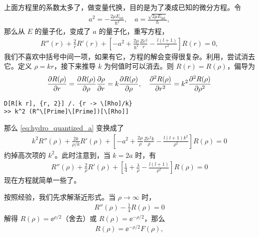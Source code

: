 上面方程里的系数太多了，做变量代换，目的是为了凑成已知的微分方程。令
\begin{align}
    a^2 = -\frac{2\mu E_{\mathrm{int}}}{\hbar^2}, \quad 
    a = \frac{\sqrt{2\mu E_{\mathrm{int}}}} {\hbar}, 
\end{align}
那么从 $E$ 的量子化，变成了 $a$ 的量子化，重写方程，
\begin{align}
    R''(r) + \frac2r R'(r) + \left[
        -a^2 + \frac{2\mu}{\hbar^2} \frac{Ze^2}{r} - \frac{l(l+1)}{r^2}
    \right] R(r) = 0, \label{eq:hydro_quantized_a}
\end{align}
我们不喜欢中括号中间一项，如果有它，方程的解会变得很复杂。利用，尝试消去它。定义 $\rho = kr$，接下来推导 $k$ 为何值时可以消去。则 $R(r) = R(\rho)$，偏导为
\begin{align}
    \pdv{R(\rho)}{r} = \pdv{R(\rho)}{\rho} \pdv{\rho}{r} = k \pdv{R(\rho)}{\rho}, \quad \pdv[2]{R(\rho)}{r} 
    = k^2 \pdv[2]{R(\rho)}{\rho}
\end{align}
\begin{lstlisting}
D[R[k r], {r, 2}] /. {r -> \[Rho]/k}
>> k^2 (R^\[Prime]\[Prime])[\[Rho]]
\end{lstlisting}
那么 \eqref{eq:hydro_quantized_a} 变换成了
\begin{align}
    k^2 R''(\rho) + \frac{2k}{\rho/k} R'(\rho) + \left[
        -a^2 + \frac{2\mu}{\rho} \frac{Ze^2k}{\rho} - \frac{l(l+1)k^2}{\rho^2}
    \right] R(\rho) = 0
\end{align}
约掉高次项的 $k^2$。此时注意到，当 $k=2a$ 时，有
\begin{align}
    R''(\rho) + \frac2{\rho} R'(\rho) + \left[
        \frac14 + \frac{\lambda}{\rho} - \frac{l(l+1)}{\rho^2}
    \right] R(\rho) = 0
\end{align}
现在方程就简单一些了。

按照经验，我们先求解渐近形式。当 $\rho \rightarrow \infty$ 时，
\begin{align}
    R''(\rho) - \frac14 R(\rho) = 0
\end{align}
解得 $R(\rho) = \ee^{\rho/2}$（舍去）或 $R(\rho) = \ee^{-\rho/2}$，那么
\begin{align}
    R(\rho) = \ee^{-\rho/2} F(\rho),
\end{align}

